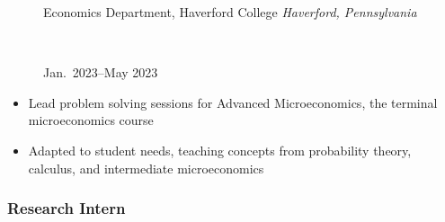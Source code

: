 \documentclass[
  letterpaper,
  DIV=11,
  numbers=noendperiod]{scrartcl}
\providecommand{\tightlist}{%
  \setlength{\itemsep}{0pt}\setlength{\parskip}{0pt}}\usepackage{longtable,booktabs,array}
\begin{document}
\begin{figure}

\begin{minipage}[t]{0.49\linewidth}

{\centering 

\RaggedRight Economics Department, Haverford College \newline
\emph{Haverford, Pennsylvania}

}

\end{minipage}%
%
\begin{minipage}[t]{0.02\linewidth}

{\centering 

~

}

\end{minipage}%
%
\begin{minipage}[t]{0.49\linewidth}

{\centering 

\RaggedLeft Jan.~2023--May 2023

}

\end{minipage}%

\end{figure}

\begin{itemize}
\tightlist
\item
  Lead problem solving sessions for Advanced Microeconomics, the
  terminal microeconomics course
\item
  Adapted to student needs, teaching concepts from probability theory,
  calculus, and intermediate microeconomics
\end{itemize}

\hypertarget{research-intern}{%
\subsubsection{Research Intern}\label{research-intern}}
\end{document}
